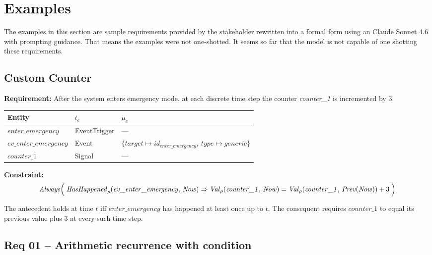 \section{Examples}

The examples in this section are sample requirements provided by the stakeholder rewritten into a formal form using an Claude Sonnet 4.6 with prompting guidance. That means the examples were not one-shotted. It seems so far that the model is not capable of one shotting these requirements.

\subsection{Custom Counter}

\textbf{Requirement:} After the system enters emergency mode, at each discrete time step the counter \textit{counter\_1} is incremented by 3.

\medskip

\begin{center}
\begin{tabular}{lll}
    \toprule
    \textbf{Entity} & $t_e$ & $\mu_e$ \\
    \midrule
    $\mathit{enter\_emergency}$ & EventTrigger & --- \\
    $\mathit{ev\_enter\_emergency}$ & Event & $\{\mathit{target} \mapsto id_{\mathit{enter\_emergency}},\ \mathit{type} \mapsto \mathit{generic}\}$ \\
    $\mathit{counter\_1}$ & Signal & --- \\
    \bottomrule
\end{tabular}
\end{center}

\textbf{Constraint:}
\begin{align*}
    \mathit{Always}\Bigl(\;
        \mathit{HasHappened}_\rho(\mathit{ev\_enter\_emergency},\, \mathit{Now})
        \Rightarrow \mathit{Val}_\rho(\mathit{counter\_1},\, \mathit{Now}) = \mathit{Val}_\rho(\mathit{counter\_1},\, \mathit{Prev}(\mathit{Now})) + 3
    \;\Bigr)
\end{align*}

The antecedent holds at time $t$ iff $\mathit{enter\_emergency}$ has happened at least once up to $t$.
The consequent requires $\mathit{counter\_1}$ to equal its previous value plus 3 at every such time step.

\subsection{Req 01 -- Arithmetic recurrence with condition}

